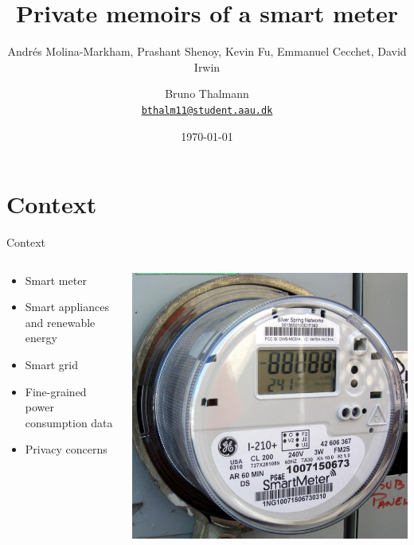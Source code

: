 \documentclass[10pt]{beamer}
\title{Private memoirs of a smart meter}
\subtitle{Andrés Molina-Markham, Prashant Shenoy, Kevin Fu, Emmanuel Cecchet, David Irwin}  %
\date{\today}
\author{
  Bruno Thalmann\\
  \href{mailto:bthalm11@student.aau.dk}{{\tt bthalm11@student.aau.dk}}
}
\institute[
  Dept.\ of Computer Science\\
  Aalborg University\\
  Denmark
] %
{%
  Department of Computer Science\\
  Aalborg University\\
  Denmark
  
}
\begin{document}
{\aauwavesbg%
\begin{frame} %
  \titlepage
\end{frame}}


\section{Context}
\begin{frame}{Context}
  \begin{columns}[T]
    \begin{column}{.5\textwidth}
      \begin{itemize}
        \itemsep1em
  \item Smart meter
  \item Smart appliances and renewable energy
  \item Smart grid
  \item Fine-grained power consumption data
  \item Privacy concerns
  \end{itemize}
    \end{column}
    \begin{column}{.5\textwidth}
      \includegraphics[scale=.5]{graphics/smart-meter.jpg}
    \end{column}
  \end{columns}
\end{frame}
\end{document}
